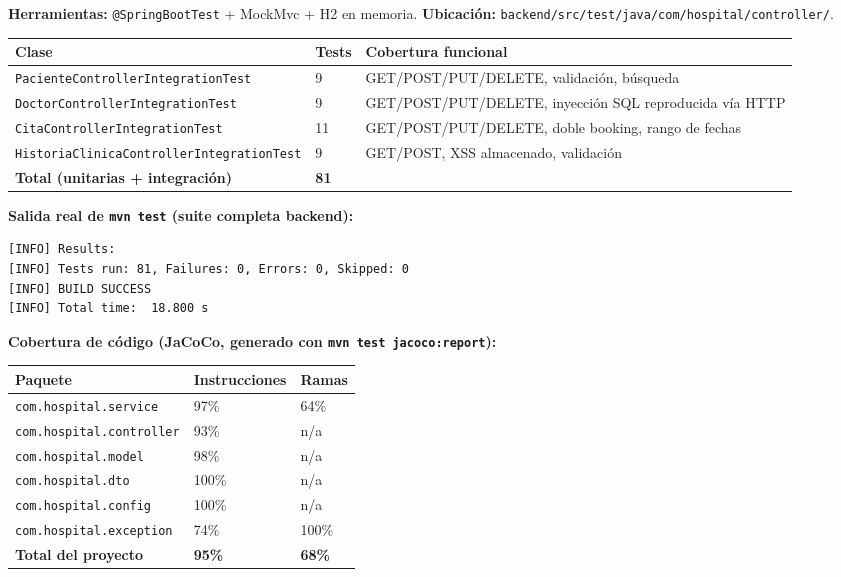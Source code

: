 \documentclass[11pt,a4paper]{article}
\begin{document}
\textbf{Herramientas:} \texttt{@SpringBootTest} + MockMvc + H2 en memoria.
\textbf{Ubicaci\'on:} \texttt{backend/src/test/java/com/hospital/controller/}.

\begin{longtable}{@{}p{6cm}p{2.5cm}p{5cm}@{}}
\toprule
\textbf{Clase} & \textbf{Tests} & \textbf{Cobertura funcional} \\
\midrule
\endhead
\texttt{PacienteControllerIntegrationTest} & 9 & GET/POST/PUT/DELETE, validaci\'on, b\'usqueda \\
\texttt{DoctorControllerIntegrationTest} & 9 & GET/POST/PUT/DELETE, inyecci\'on SQL reproducida v\'ia HTTP \\
\texttt{CitaControllerIntegrationTest} & 11 & GET/POST/PUT/DELETE, doble booking, rango de fechas \\
\texttt{HistoriaClinicaControllerIntegrationTest} & 9 & GET/POST, XSS almacenado, validaci\'on \\
\midrule
\textbf{Total (unitarias + integraci\'on)} & \textbf{81} & \\
\bottomrule
\end{longtable}

\textbf{Salida real de \texttt{mvn test} (suite completa backend):}
\begin{lstlisting}
[INFO] Results:
[INFO] Tests run: 81, Failures: 0, Errors: 0, Skipped: 0
[INFO] BUILD SUCCESS
[INFO] Total time:  18.800 s
\end{lstlisting}

\textbf{Cobertura de c\'odigo (JaCoCo, generado con \texttt{mvn test jacoco:report}):}

\begin{longtable}{@{}p{4cm}p{2.5cm}p{2.5cm}@{}}
\toprule
\textbf{Paquete} & \textbf{Instrucciones} & \textbf{Ramas} \\
\midrule
\endhead
\texttt{com.hospital.service} & 97\% & 64\% \\
\texttt{com.hospital.controller} & 93\% & n/a \\
\texttt{com.hospital.model} & 98\% & n/a \\
\texttt{com.hospital.dto} & 100\% & n/a \\
\texttt{com.hospital.config} & 100\% & n/a \\
\texttt{com.hospital.exception} & 74\% & 100\% \\
\midrule
\textbf{Total del proyecto} & \textbf{95\%} & \textbf{68\%} \\
\bottomrule
\end{longtable}
\end{document}
